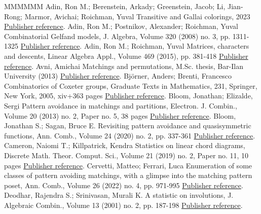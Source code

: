 \documentclass[11pt]{article}
\theoremstyle{definition}
\numberwithin{equation}{section}
\begin{document}
\begin{thebibliography}{MMMMMM}
 Adin, Ron M.; Berenstein, Arkady; Greenstein, Jacob; Li, Jian-Rong; Marmor, Avichai; Roichman, Yuval Transitive and Gallai colorings, 2023 \href{https://alco.centre-mersenne.org/articles/10.5802/alco.351/#gallai}{Publisher reference}.
 Adin, Ron M.; Postnikov, Alexander; Roichman, Yuval Combinatorial Gelfand models, J. Algebra, Volume 320 (2008) no. 3, pp. 1311-1325 \href{https://alco.centre-mersenne.org/articles/10.5802/alco.351/#gelfand_involutions}{Publisher reference}.
 Adin, Ron M.; Roichman, Yuval Matrices, characters and descents, Linear Algebra Appl., Volume 469 (2015), pp. 381-418 \href{https://alco.centre-mersenne.org/articles/10.5802/alco.351/#adin_roichman_fine_set}{Publisher reference}.
 Avni, Amichai Matchings and permutations, M.Sc. thesis, Bar-Ilan University (2013) \href{https://alco.centre-mersenne.org/articles/10.5802/alco.351/#avni_perfect_matchings}{Publisher reference}.
 Björner, Anders; Brenti, Francesco Combinatorics of Coxeter groups, Graduate Texts in Mathematics, 231, Springer, New York, 2005, xiv+363 pages \href{https://alco.centre-mersenne.org/articles/10.5802/alco.351/#bjorner2005combinatorics}{Publisher reference}.
 Bloom, Jonathan; Elizalde, Sergi Pattern avoidance in matchings and partitions, Electron. J. Combin., Volume 20 (2013) no. 2, Paper no. 5, 38 pages \href{https://alco.centre-mersenne.org/articles/10.5802/alco.351/#bloom2013pattern}{Publisher reference}.
 Bloom, Jonathan S.; Sagan, Bruce E. Revisiting pattern avoidance and quasisymmetric functions, Ann. Comb., Volume 24 (2020) no. 2, pp. 337-361 \href{https://alco.centre-mersenne.org/articles/10.5802/alco.351/#BloomSagan}{Publisher reference}.
 Cameron, Naiomi T.; Killpatrick, Kendra Statistics on linear chord diagrams, Discrete Math. Theor. Comput. Sci., Volume 21 (2019) no. 2, Paper no. 11, 10 pages \href{https://alco.centre-mersenne.org/articles/10.5802/alco.351/#killpatrick2020statistics}{Publisher reference}.
 Cervetti, Matteo; Ferrari, Luca Enumeration of some classes of pattern avoiding matchings, with a glimpse into the matching pattern poset, Ann. Comb., Volume 26 (2022) no. 4, pp. 971-995 \href{https://alco.centre-mersenne.org/articles/10.5802/alco.351/#cervetti2022enumeration}{Publisher reference}.
 Deodhar, Rajendra S.; Srinivasan, Murali K. A statistic on involutions, J. Algebraic Combin., Volume 13 (2001) no. 2, pp. 187-198 \href{https://alco.centre-mersenne.org/articles/10.5802/alco.351/#deodhar2001statistic}{Publisher reference}.

\end{thebibliography}
\end{document}
